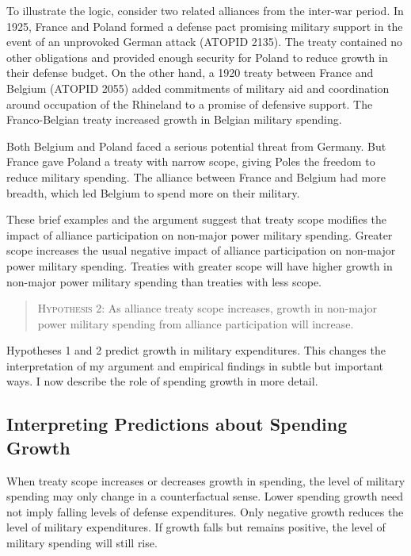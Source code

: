 \documentclass[12pt]{article}
\begin{document}
To illustrate the logic, consider two related alliances from the inter-war period. 
In 1925, France and Poland formed a defense pact promising military support in the event of an unprovoked German attack (ATOPID 2135). 
The treaty contained no other obligations and provided enough security for Poland to reduce growth in their defense budget.
On the other hand, a 1920 treaty between France and Belgium (ATOPID 2055) added commitments of military aid and coordination around occupation of the Rhineland to a promise of defensive support. 
The Franco-Belgian treaty increased growth in Belgian military spending. 


Both Belgium and Poland faced a serious potential threat from Germany. 
But France gave Poland a treaty with narrow scope, giving Poles the freedom to reduce military spending. 
The alliance between France and Belgium had more breadth, which led Belgium to spend more on their military. 


These brief examples and the argument suggest that treaty scope modifies the impact of alliance participation on non-major power military spending. 
Greater scope increases the usual negative impact of alliance participation on non-major power military spending. 
Treaties with greater scope will have higher growth in non-major power military spending than treaties with less scope. 


\begin{quote}
\textsc{Hypothesis 2}: As alliance treaty scope increases, growth in non-major power military spending from alliance participation will increase. 
\end{quote}


Hypotheses 1 and 2 predict growth in military expenditures. 
This changes the interpretation of my argument and empirical findings in subtle but important ways. 
I now describe the role of spending growth in more detail. 


\subsection{Interpreting Predictions about Spending Growth}


When treaty scope increases or decreases growth in spending, the level of military spending may only change in a counterfactual sense. 
Lower spending growth need not imply falling levels of defense expenditures. 
Only negative growth reduces the level of military expenditures. 
If growth falls but remains positive, the level of military spending will still rise. 
\end{document}
